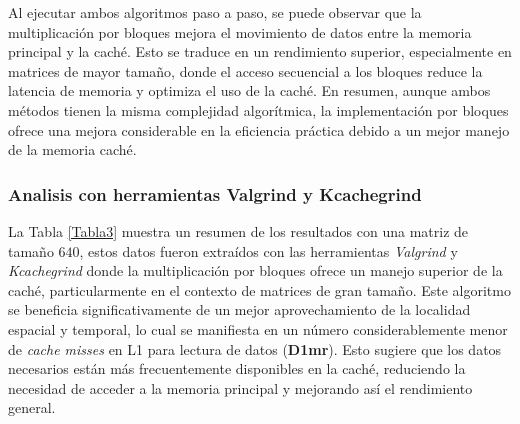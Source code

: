 \documentclass[conference]{IEEEtran}
\begin{document}
Al ejecutar ambos algoritmos paso a paso, se puede observar que la multiplicación por bloques mejora el movimiento de datos entre la memoria principal y la caché. Esto se traduce en un rendimiento superior, especialmente en matrices de mayor tamaño, donde el acceso secuencial a los bloques reduce la latencia de memoria y optimiza el uso de la caché. En resumen, aunque ambos métodos tienen la misma complejidad algorítmica, la implementación por bloques ofrece una mejora considerable en la eficiencia práctica debido a un mejor manejo de la memoria caché.

\subsubsection{\textbf{Analisis con herramientas Valgrind y Kcachegrind}}


La Tabla \ref{Tabla3} muestra un resumen de los resultados con una matriz de tamaño $640$, estos datos fueron extraídos con las herramientas \textit{Valgrind} y \textit{Kcachegrind} donde la multiplicación por bloques ofrece un manejo superior de la caché, particularmente en el contexto de matrices de gran tamaño. Este algoritmo se beneficia significativamente de un mejor aprovechamiento de la localidad espacial y temporal, lo cual se manifiesta en un número considerablemente menor de \textit{cache misses} en L1 para lectura de datos (\textbf{D1mr}). Esto sugiere que los datos necesarios están más frecuentemente disponibles en la caché, reduciendo la necesidad de acceder a la memoria principal y mejorando así el rendimiento general.
\end{document}
